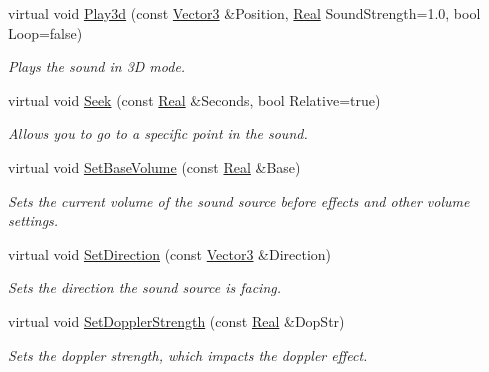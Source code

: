 \begin{DoxyCompactItemize}
virtual void \hyperlink{classMezzanine_1_1Audio_1_1Sound_a5e30d7724149dae882cd5767a05bb754}{Play3d} (const \hyperlink{classMezzanine_1_1Vector3}{Vector3} \&Position, \hyperlink{namespaceMezzanine_a726731b1a7df72bf3583e4a97282c6f6}{Real} SoundStrength=1.0, bool Loop=false)
\begin{DoxyCompactList}\small\item\em Plays the sound in 3D mode. \item\end{DoxyCompactList}\item 
virtual void \hyperlink{classMezzanine_1_1Audio_1_1Sound_a345874faf8a50fdd9f689f231d4da310}{Seek} (const \hyperlink{namespaceMezzanine_a726731b1a7df72bf3583e4a97282c6f6}{Real} \&Seconds, bool Relative=true)
\begin{DoxyCompactList}\small\item\em Allows you to go to a specific point in the sound. \item\end{DoxyCompactList}\item 
virtual void \hyperlink{classMezzanine_1_1Audio_1_1Sound_a90f305991e5ca0a5edab80a63161b6aa}{SetBaseVolume} (const \hyperlink{namespaceMezzanine_a726731b1a7df72bf3583e4a97282c6f6}{Real} \&Base)
\begin{DoxyCompactList}\small\item\em Sets the current volume of the sound source before effects and other volume settings. \item\end{DoxyCompactList}\item 
virtual void \hyperlink{classMezzanine_1_1Audio_1_1Sound_ab1ce22cea03635eccdc50a7c685137c5}{SetDirection} (const \hyperlink{classMezzanine_1_1Vector3}{Vector3} \&Direction)
\begin{DoxyCompactList}\small\item\em Sets the direction the sound source is facing. \item\end{DoxyCompactList}\item 
virtual void \hyperlink{classMezzanine_1_1Audio_1_1Sound_a1e3cf13e3ca46410356872ee23f2d526}{SetDopplerStrength} (const \hyperlink{namespaceMezzanine_a726731b1a7df72bf3583e4a97282c6f6}{Real} \&DopStr)
\begin{DoxyCompactList}\small\item\em Sets the doppler strength, which impacts the doppler effect. \item\end{DoxyCompactList}\item 

\end{DoxyCompactItemize}
